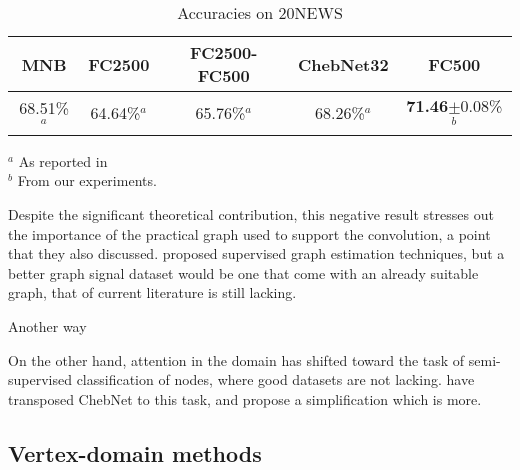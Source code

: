\begin{table}[H]
  \caption{Accuracies on 20NEWS}
  \begin{center}
    \bgroup
    \def\arraystretch{1.5}%
    \begin{tabular}{|c|c|c|c|c|}
      \hline
      MNB & FC2500 & FC2500-FC500 & ChebNet32 & FC500\\
      \hline
      68.51\%$^a$ & 64.64\%$^a$ & 65.76\%$^a$ & 68.26\%$^a$ & \textbf{71.46}$\pm$0.08\%$^b$\\
      \hline
    \end{tabular}
    \egroup
  \end{center}
\begin{flushleft}
\footnotesize{
$^a$ As reported in \cite{defferrard2016convolutional}\\
$^b$ From our experiments.
}
\end{flushleft}
  \label{tab:20}
\end{table}

Despite the significant theoretical contribution, this negative result stresses out the importance of the practical graph used to support the convolution, a point that they also discussed. \cite{henaff2015deep} proposed supervised graph estimation techniques, but a better graph signal dataset would be one that come with an already suitable graph, that of current literature is still lacking.

Another way







On the other hand, attention in the domain has shifted toward the task of semi-supervised classification of nodes, where good datasets are not lacking. \cite{kipf2016semi} have transposed ChebNet to this task, and propose a simplification which is more.




\subsection{Vertex-domain methods}
\label{sec:vert}


